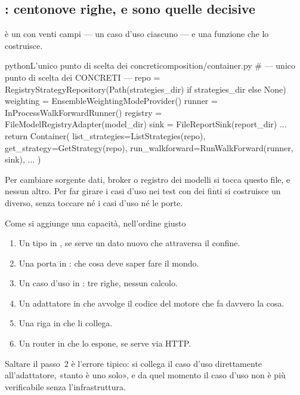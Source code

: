 \subsection{\pkgComposizione: centonove righe, e sono quelle decisive}

 è un  con venti campi --- un
caso d'uso ciascuno --- e una funzione che lo costruisce.

\begin{codiceInterno}{python}{L'unico punto di scelta dei concreti}{composition/container.py}
    # --- unico punto di scelta dei CONCRETI ---
    repo = RegistryStrategyRepository(Path(strategies_dir) if strategies_dir else None)
    weighting = EnsembleWeightingModeProvider()
    runner = InProcessWalkForwardRunner()
    registry = FileModelRegistryAdapter(model_dir)
    sink = FileReportSink(report_dir)
    ...
    return Container(
        list_strategies=ListStrategies(repo),
        get_strategy=GetStrategy(repo),
        run_walkforward=RunWalkForward(runner, sink),
        ...
    )
\end{codiceInterno}

\noindent
Per cambiare sorgente dati, broker o registro dei modelli si tocca questo
file, e nessun altro. Per far girare i casi d'uso nei test con dei finti si
costruisce un  diverso, senza toccare né i casi d'uso né
le porte.

\begin{pratica}{Come si aggiunge una capacità, nell'ordine giusto}
\begin{enumerate}
  \item Un tipo in \pkgDominio, se serve un dato nuovo che attraversa il
        confine.
  \item Una porta in \pkgPorte: che cosa deve saper fare il mondo.
  \item Un caso d'uso in \pkgApplicazione: tre righe, nessun calcolo.
  \item Un adattatore in \pkgAdattatori{} che avvolge il codice del motore
        che fa davvero la cosa.
  \item Una riga in  che li collega.
  \item Un router in \pkgApi{} che lo espone, se serve via HTTP.
\end{enumerate}
Saltare il passo~\num{2} è l'errore tipico: si collega il caso d'uso
direttamente all'adattatore, «tanto è uno solo», e da quel momento il caso
d'uso non è più verificabile senza l'infrastruttura.
\end{pratica}
